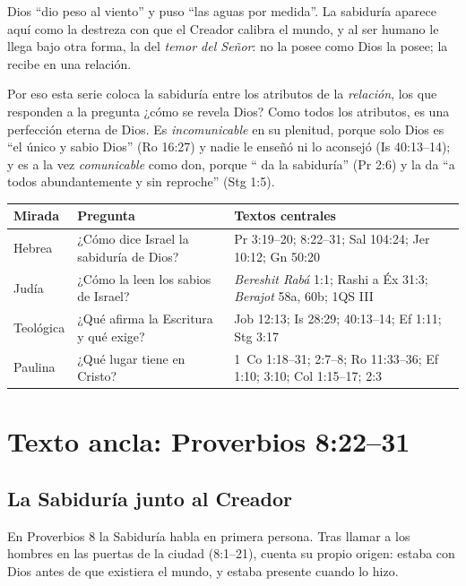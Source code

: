 Dios ``dio peso al viento'' y puso ``las aguas por medida''. La sabiduría aparece aquí como la destreza con que el Creador calibra el mundo, y al ser humano le llega bajo otra forma, la del \emph{temor del Señor}: no la posee como Dios la posee; la recibe en una relación.

Por eso esta serie coloca la sabiduría entre los atributos de la \emph{relación}, los que responden a la pregunta ¿cómo se revela Dios? Como todos los atributos, es una perfección eterna de Dios. Es \emph{incomunicable} en su plenitud, porque solo Dios es ``el único y sabio Dios'' (Ro 16:27) y nadie le enseñó ni lo aconsejó (Is 40:13--14); y es a la vez \emph{comunicable} como don, porque ``\SENOR{} da la sabiduría'' (Pr 2:6) y la da ``a todos abundantemente y sin reproche'' (Stg 1:5).

\begin{center}\small\renewcommand{\arraystretch}{1.25}
\begin{tabular}{@{}L{3.4cm}L{5.4cm}L{5.6cm}@{}}
\toprule
\textbf{Mirada} & \textbf{Pregunta} & \textbf{Textos centrales} \\ \midrule
Hebrea & ¿Cómo dice Israel la sabiduría de Dios? & Pr 3:19--20; 8:22--31; Sal 104:24; Jer 10:12; Gn 50:20 \\
Judía & ¿Cómo la leen los sabios de Israel? & \emph{Bereshit Rabá} 1:1; Rashi a Éx 31:3; \emph{Berajot} 58a, 60b; 1QS III \\
Teológica & ¿Qué afirma la Escritura y qué exige? & Job 12:13; Is 28:29; 40:13--14; Ef 1:11; Stg 3:17 \\
Paulina & ¿Qué lugar tiene en Cristo? & 1~Co 1:18--31; 2:7--8; Ro 11:33--36; Ef 1:10; 3:10; Col 1:15--17; 2:3 \\
\bottomrule
\end{tabular}\end{center}

\section{Texto ancla: Proverbios 8:22--31}

\subsection{La Sabiduría junto al Creador}

En Proverbios 8 la Sabiduría habla en primera persona. Tras llamar a los hombres en las puertas de la ciudad (8:1--21), cuenta su propio origen: estaba con Dios antes de que existiera el mundo, y estaba presente cuando lo hizo.

